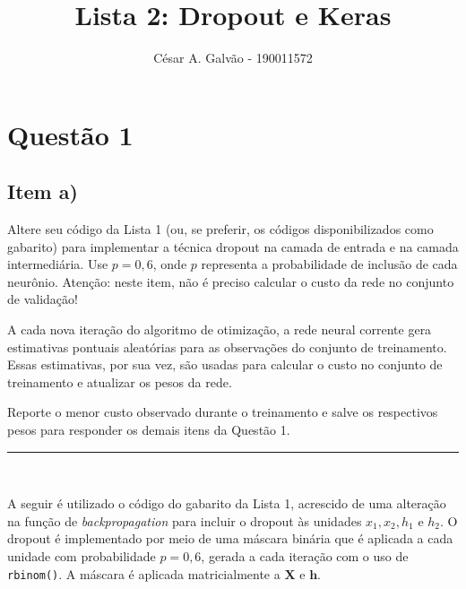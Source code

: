 \documentclass[
  a4paperpaper,
]{article}
\title{Lista 2: Dropout e Keras}
\author{César A. Galvão - 190011572}
\date{}
\begin{document}
\maketitle

\section{Questão 1}\label{questuxe3o-1}

\subsection{Item a)}\label{sec-1a}

Altere seu código da Lista 1 (ou, se preferir, os códigos
disponibilizados como gabarito) para implementar a técnica dropout na
camada de entrada e na camada intermediária. Use \(p = 0,6\), onde \(p\)
representa a probabilidade de inclusão de cada neurônio. Atenção: neste
item, não é preciso calcular o custo da rede no conjunto de validação!

A cada nova iteração do algoritmo de otimização, a rede neural corrente
gera estimativas pontuais aleatórias para as observações do conjunto de
treinamento. Essas estimativas, por sua vez, são usadas para calcular o
custo no conjunto de treinamento e atualizar os pesos da rede.

Reporte o menor custo observado durante o treinamento e salve os
respectivos pesos para responder os demais itens da Questão 1.

\begin{center}\rule{0.5\linewidth}{0.5pt}\end{center}

~

A seguir é utilizado o código do gabarito da Lista 1, acrescido de uma
alteração na função de \emph{backpropagation} para incluir o dropout às
unidades \(x_1, x_2, h_1\) e \(h_2\). O dropout é implementado por meio
de uma máscara binária que é aplicada a cada unidade com probabilidade
\(p = 0,6\), gerada a cada iteração com o uso de \texttt{rbinom()}. A
máscara é aplicada matricialmente a \(\mathbf{X}\) e \(\mathbf{h}\).

~
\end{document}
